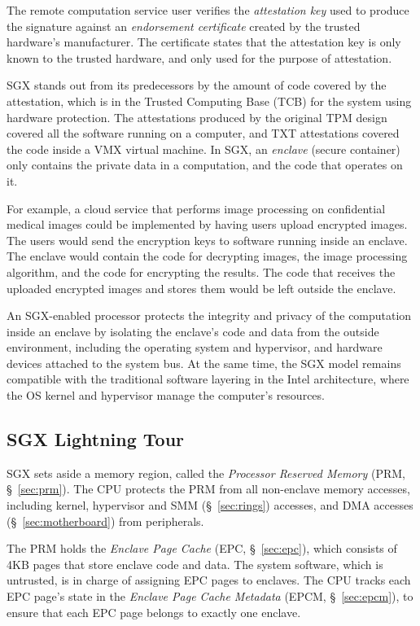 The remote computation service user verifies the \textit{attestation key} used
to produce the signature against an \textit{endorsement certificate} created by
the trusted hardware's manufacturer. The certificate states that the
attestation key is only known to the trusted hardware, and only used for the
purpose of attestation.

SGX stands out from its predecessors by the amount of code covered by the
attestation, which is in the Trusted Computing Base (TCB) for the system using
hardware protection. The attestations produced by the original TPM design
covered all the software running on a computer, and TXT attestations covered
the code inside a VMX \cite{uhlig2005vmx} virtual machine. In SGX, an
\textit{enclave} (secure container) only contains the private data in a
computation, and the code that operates on it.

For example, a cloud service that performs image processing on confidential
medical images could be implemented by having users upload encrypted images.
The users would send the encryption keys to software running inside an enclave.
The enclave would contain the code for decrypting images, the image processing
algorithm, and the code for encrypting the results. The code that receives the
uploaded encrypted images and stores them would be left outside the enclave.

An SGX-enabled processor protects the integrity and privacy of the computation
inside an enclave by isolating the enclave's code and data from the outside
environment, including the operating system and hypervisor, and hardware
devices attached to the system bus. At the same time, the SGX model remains
compatible with the traditional software layering in the Intel architecture,
where the OS kernel and hypervisor manage the computer's resources.


\subsection{SGX Lightning Tour}
\label{sec:intro_sgx}

SGX sets aside a memory region, called the \textit{Processor Reserved Memory}
(PRM, \S~\ref{sec:prm}). The CPU protects the PRM from all non-enclave memory
accesses, including kernel, hypervisor and SMM (\S~\ref{sec:rings}) accesses,
and DMA accesses (\S~\ref{sec:motherboard}) from peripherals.

The PRM holds the \textit{Enclave Page Cache} (EPC, \S~\ref{sec:epc}), which
consists of 4KB pages that store enclave code and data. The system software,
which is untrusted, is in charge of assigning EPC pages to enclaves. The CPU
tracks each EPC page's state in the \textit{Enclave Page Cache Metadata} (EPCM,
\S~\ref{sec:epcm}), to ensure that each EPC page belongs to exactly one
enclave.


